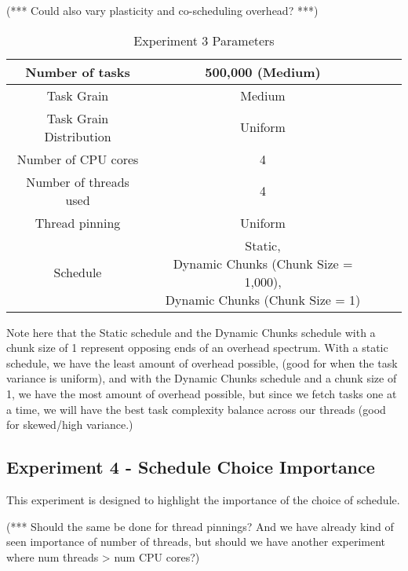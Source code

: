 (*** Could also vary plasticity and co-scheduling overhead? ***)



\begin{table}
\centering
	\begin{tabular}{|c|c|c|c|}
		\hline
		Number of tasks & 500,000 (Medium) \\
		\hline
		Task Grain & Medium \\
		\hline
		Task Grain Distribution & Uniform \\
		\hline
		Number of CPU cores & 4 \\
		\hline
		Number of threads used & 4 \\
		\hline
		Thread pinning & Uniform \\
		\hline
		Schedule & \specialcell{Static, \\ Dynamic Chunks (Chunk Size = 1,000), \\ Dynamic Chunks (Chunk Size = 1)} \\
		\hline
	\end{tabular}
\caption{Experiment 3 Parameters}
\label{table:ex3_parameters}
\end{table}



Note here that the Static schedule and the Dynamic Chunks schedule with a chunk size of 1 represent opposing ends of an overhead spectrum. With a static schedule, we have the least amount of overhead possible, (good for when the task variance is uniform), and with the Dynamic Chunks schedule and a chunk size of 1, we have the most amount of overhead possible, but since we fetch tasks one at a time, we will have the best task complexity balance across our threads (good for skewed/high variance.)



\subsection{Experiment 4 - Schedule Choice Importance}

This experiment is designed to highlight the importance of the choice of schedule.

(*** Should the same be done for thread pinnings? And we have already kind of seen importance of number of threads, but should we have another experiment where num threads > num CPU cores?)



